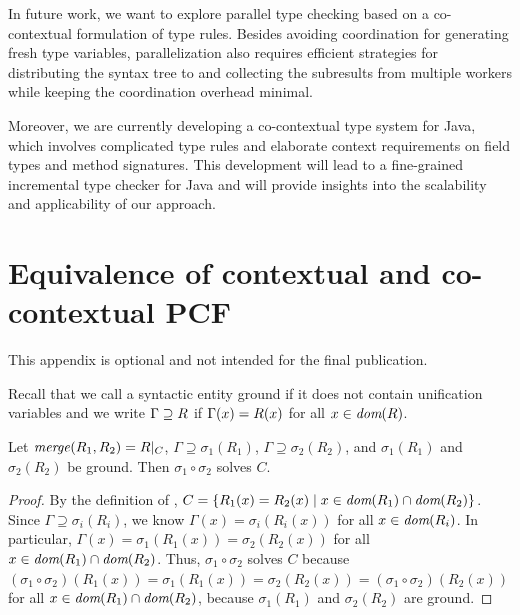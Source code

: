 \documentclass{llncs}
\begin{document}
In future work, we want to explore parallel type checking based on a
co-contextual formulation of type rules. Besides avoiding coordination for
generating fresh type variables, parallelization also requires efficient
strategies for distributing the syntax tree to and collecting the subresults
from multiple workers while keeping the coordination overhead minimal.

Moreover, we are currently developing a co-contextual type system for Java,
which involves complicated type rules and elaborate context requirements on
field types and method signatures. This development will lead to a fine-grained
incremental type checker for Java and will provide insights into the scalability
and applicability of our approach.







\clearpage
\appendix

\section{Equivalence of contextual and co-contextual PCF}
\label{sec:appendix}

This appendix is optional and not intended for the final publication.

Recall that we call a syntactic entity ground if it does not contain unification
variables and we write $\Gamma \supseteq R$ if $\Gamma(x) = R(x)$ for
all $x \in \textit{dom}(R)$.


\begin{lemma}
\label{lem:merge-cons}
  Let $\mathit{merge}(R_1, R_2)=R|_C$, $\Gamma \supseteq \sigma_1(R_1)$, $\Gamma
  \supseteq \sigma_2(R_2)$, and $\sigma_1(R_1)$ and $\sigma_2(R_2)$ be ground.
  Then $\sigma_1\circ\sigma_2$ solves $C$.
\end{lemma}
\begin{proof}
  By the definition of \reqmergeF, $C = \{R_1(x) = R_2(x) \;|\; x \in \textit{dom}(R_1) \cap \textit{dom}(R_2)\}$.
%
  Since $\Gamma \supseteq \sigma_i(R_i)$, we know $\Gamma(x) = \sigma_i(R_i(x))$ for all $x \in \textit{dom}(R_i)$.
%
  In particular, $\Gamma(x)=\sigma_1(R_1(x))=\sigma_2(R_2(x))$ for all $x \in \textit{dom}(R_1)\cap\textit{dom}(R_2)$.
%
  Thus, $\sigma_1\circ\sigma_2$ solves $C$ because
  $(\sigma_1\circ\sigma_2)(R_1(x))=\sigma_1(R_1(x))=\sigma_2(R_2(x))=(\sigma_1\circ\sigma_2)(R_2(x))$ for all $x \in \textit{dom}(R_1)\cap\textit{dom}(R_2)$, because 
  $\sigma_1(R_1)$ and $\sigma_2(R_2)$ are ground.
\end{proof}
\end{document}
